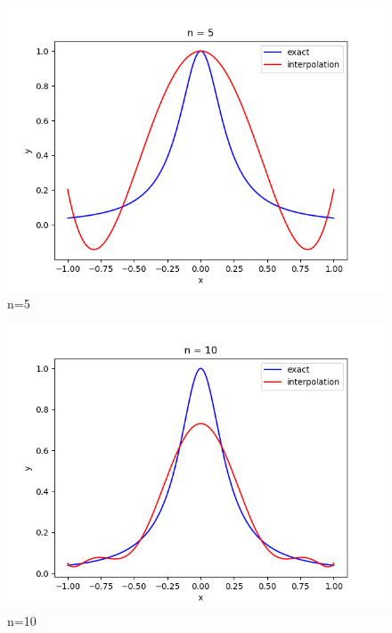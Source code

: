 \documentclass{article}
\begin{document}
    \begin{figure}[H]
        \centering
        \includegraphics{../code/output/C_n5.png}
        \caption{n=5}
    \end{figure} 

    \begin{figure}[H]
        \centering
        \includegraphics{../code/output/C_n10.png}
        \caption{n=10}
    \end{figure} 
\end{document}
